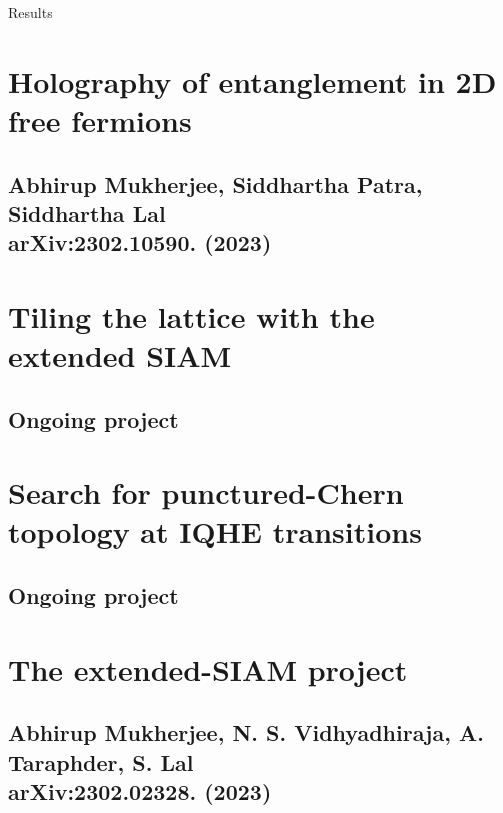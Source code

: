 \documentclass[aspectratio=169]{beamer}
\begin{document}
\begin{frame}{Results}
	
\end{frame}

\section{Holography of entanglement in 2D free fermions}
\subsection{Abhirup Mukherjee, Siddhartha Patra, Siddhartha Lal\\ arXiv:2302.10590. (2023)}

\section{Tiling the lattice with the extended SIAM}
\subsection{Ongoing project}

\section{Search for punctured-Chern topology at IQHE transitions}
\subsection{Ongoing project}

\section{The extended-SIAM project}
\subsection{Abhirup Mukherjee, N. S. Vidhyadhiraja, A. Taraphder, S. Lal\\ arXiv:2302.02328. (2023)}
\end{document}
